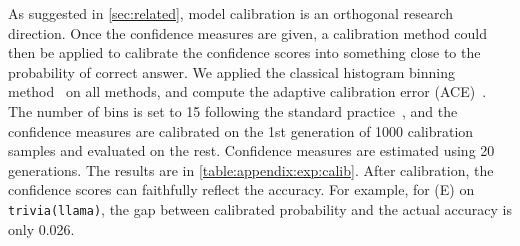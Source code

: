 As suggested in \cref{sec:related}, model calibration is an orthogonal research direction.
Once the confidence measures are given, a calibration method could then be applied to calibrate the confidence scores into something close to the probability of correct answer.
We applied the classical histogram binning method~\cite{KDD_HistogramBinning} on all methods, and compute the adaptive calibration error (ACE)~\cite{Nixon_2019_CVPR_Workshops}.
The number of bins is set to 15 following the standard practice~\cite{Nixon_2019_CVPR_Workshops}, and the confidence measures are calibrated on the 1st generation of 1000 calibration samples and evaluated on the rest.
Confidence measures are estimated using 20 generations.
The results are in \cref{table:appendix:exp:calib}.
After calibration, the confidence scores can faithfully reflect the accuracy.
For example, for \methodEcc(E) on \texttt{trivia(llama)}, the gap between calibrated probability and the actual accuracy is only 0.026.

